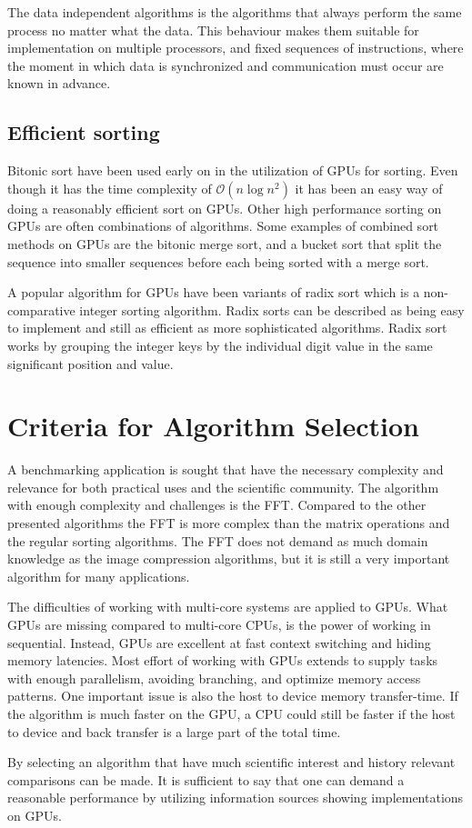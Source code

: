 The data independent algorithms is the algorithms that always perform the same process no matter what the data. This behaviour makes them suitable for implementation on multiple processors, and fixed sequences of instructions, where the moment in which data is synchronized and communication must occur are known in advance.

\subsection{Efficient sorting}
Bitonic sort have been used early on in the utilization of \gls{GPU}s for sorting. Even though it has the time complexity of $\mathcal{O}(n\log{n^2})$ it has been an easy way of doing a reasonably efficient sort on \gls{GPU}s. Other high performance sorting on \gls{GPU}s are often combinations of algorithms. Some examples of combined sort methods on GPUs are the bitonic merge sort, and a bucket sort that split the sequence into smaller sequences before each being sorted with a merge sort.

A popular algorithm for GPUs have been variants of radix sort which is a non-comparative integer sorting algorithm. Radix sorts can be described as being easy to implement and still as efficient as more sophisticated algorithms. Radix sort works by grouping the integer keys by the individual digit value in the same significant position and value.

\section{Criteria for Algorithm Selection}
A benchmarking application is sought that have the necessary complexity and relevance for both practical uses and the scientific community. The algorithm with enough complexity and challenges is the \gls{FFT}. Compared to the other presented algorithms the \gls{FFT} is more complex than the matrix operations and the regular sorting algorithms. The \gls{FFT} does not demand as much domain knowledge as the image compression algorithms, but it is still a very important algorithm for many applications.

The difficulties of working with multi-core systems are applied to \gls{GPU}s. What \gls{GPU}s are missing compared to multi-core \gls{CPU}s, is the power of working in sequential. Instead, \gls{GPU}s are excellent at fast context switching and hiding memory latencies. Most effort of working with \gls{GPU}s extends to supply tasks with enough parallelism, avoiding branching, and optimize memory access patterns. One important issue is also the host to device memory transfer-time. If the algorithm is much faster on the \gls{GPU}, a \gls{CPU} could still be faster if the host to device and back transfer is a large part of the total time.

By selecting an algorithm that have much scientific interest and history relevant comparisons can be made. It is sufficient to say that one can demand a reasonable performance by utilizing information sources showing implementations on \gls{GPU}s.
